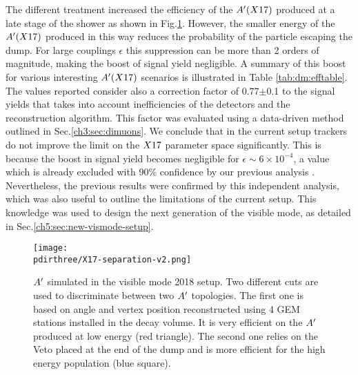 The different treatment increased the efficiency of the $A'(X17)$ produced at a late stage of the shower as shown in Fig.\ref{fig:combined-analysis}. However, the smaller energy of the $A'(X17)$ produced in this way reduces the probability of the particle escaping the dump. For large couplings $\epsilon$ this suppression can be more than 2 orders of magnitude, making the boost of signal yield negligible. A summary of this boost for various interesting $A'(X17)$ scenarios is illustrated in Table \ref{tab:dm:efftable}. The values reported consider also a correction factor of 0.77$\pm$0.1 to the signal yields that takes into account inefficiencies of the detectors and the reconstruction algorithm. This factor was evaluated using a data-driven method outlined in Sec.\ref{ch3:sec:dimuons}. We conclude that in the current setup trackers do not improve the limit on the $X17$ parameter space significantly. This is because the boost in signal yield becomes negligible for $\epsilon \sim 6 \times 10^{-4}$, a value which is already excluded with 90\% confidence by our previous analysis \cite{Banerjee:2019hmi}. Nevertheless, the previous results were confirmed by this independent analysis, which was also useful to outline the limitations of the current setup. This knowledge was used to design the next generation of the visible mode, as detailed in Sec.\ref{ch5:sec:new-vismode-setup}.

\begin{figure}[tbh!]
  \centering
  \texttt{[image: \\pdirthree/X17-separation-v2.png]}
  \caption[Comparison of selected $\DM$ events between the calorimeter and tracking analysis]{$\DM$ simulated in the visible mode 2018 setup. Two different cuts are used to discriminate between two $\DM$ topologies. The first one is based on angle and vertex position reconstructed using 4 GEM stations installed in the decay volume. It is very efficient on the $\DM$ produced at low energy (red triangle). The second one relies on the Veto placed at the end of the dump and is more efficient for the high energy population (blue square).}
  \label{fig:combined-analysis}
\end{figure}

